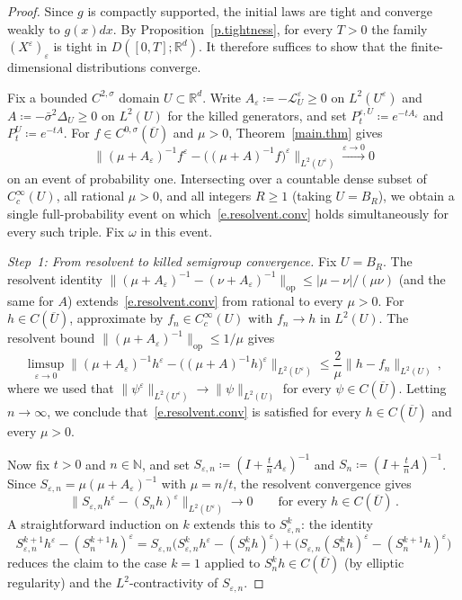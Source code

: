 \documentclass[11pt]{amsart}
\theoremstyle{plain}
\theoremstyle{definition}
\theoremstyle{remark}
\newcommand{\Rd}{\mathbb{R}^d}
\newcommand{\eps}{\varepsilon}
\begin{document}
	\begin{proof}
		Since $g$ is compactly supported, the initial laws are tight and converge weakly to $g(x) dx$.
		By Proposition~\ref{p.tightness}, for every $T > 0$ the family $(X^\eps)_\eps$ is tight in $D([0,T]; \Rd)$.
		It therefore suffices to show that the finite-dimensional distributions converge.
		
		Fix a bounded $C^{2,\sigma}$ domain $U \subset \Rd$.
		Write $A_\eps \coloneqq -\mathcal{L}_U^\eps \ge 0$ on $L^2(U^\eps)$ and $A \coloneqq -\bar\sigma^2 \Delta_U \ge 0$ on $L^2(U)$ for the killed generators, and set $P_t^{\eps,U} \coloneqq e^{-tA_\eps}$ and $P_t^U \coloneqq e^{-tA}$.
		For $f \in C^{0,\sigma}(\overline{U})$ and $\mu > 0$, Theorem~\ref{main.thm} gives
		\begin{equation}
			\label{e.resolvent.conv}
			\bigl\|(\mu + A_\eps)^{-1}f^\eps - \bigl((\mu + A)^{-1}f\bigr)^\eps\bigr\|_{L^2(U^\eps)} \xrightarrow{\eps \to 0} 0
		\end{equation}
		on an event of probability one.
		Intersecting over a countable dense subset of $C_c^\infty(U)$, all rational $\mu > 0$, and all integers $R \ge 1$ (taking $U = B_R$), we obtain a single full-probability event on which~\eqref{e.resolvent.conv} holds simultaneously for every such triple.
		Fix $\omega$ in this event.
		
		\smallskip
		
		\emph{Step~1: From resolvent to killed semigroup convergence.}
		Fix $U = B_R$.
		The resolvent identity $\|(\mu + A_\eps)^{-1} - (\nu + A_\eps)^{-1}\|_{\mathrm{op}} \le |\mu - \nu|/(\mu\nu)$ (and the same for $A$) extends~\eqref{e.resolvent.conv} from rational to every $\mu > 0$.
		For $h \in C(\overline{U})$, approximate by $f_n \in C_c^\infty(U)$ with $f_n \to h$ in $L^2(U)$.
		The resolvent bound $\|(\mu + A_\eps)^{-1}\|_{\mathrm{op}} \le 1/\mu$ gives
		\[
		\limsup_{\eps \to 0} \bigl\|(\mu + A_\eps)^{-1}h^\eps - \bigl((\mu + A)^{-1}h\bigr)^\eps\bigr\|_{L^2(U^\eps)} \le \frac{2}{\mu}\|h - f_n\|_{L^2(U)}\,,
		\]
		where we used that $\|\psi^\eps\|_{L^2(U^\eps)} \to \|\psi\|_{L^2(U)}$ for every $\psi \in C(\overline{U})$.
		Letting $n \to \infty$, we conclude that~\eqref{e.resolvent.conv} is satisfied for every $h \in C(\overline{U})$ and every $\mu > 0$.
		
		Now fix $t > 0$ and $n \in \mathbb{N}$, and set $S_{\eps,n} \coloneqq (I + \tfrac{t}{n}A_\eps)^{-1}$ and $S_n \coloneqq (I + \tfrac{t}{n}A)^{-1}$.
		Since $S_{\eps,n} = \mu(\mu + A_\eps)^{-1}$ with $\mu = n/t$, the resolvent convergence gives
		\[
		\|S_{\eps,n} h^\eps - (S_n h)^\eps\|_{L^2(U^\eps)} \to 0
		\qquad \text{for every } h \in C(\overline{U})\,.
		\]
		A straightforward induction on $k$ extends this to $S_{\eps,n}^k$: the identity
		\[
		S_{\eps,n}^{k+1}h^\eps - (S_n^{k+1}h)^\eps
		= S_{\eps,n}\bigl(S_{\eps,n}^k h^\eps - (S_n^k h)^\eps\bigr)
		+ \bigl(S_{\eps,n}(S_n^k h)^\eps - (S_n^{k+1}h)^\eps\bigr)
		\]
		reduces the claim to the case $k = 1$ applied to $S_n^k h \in C(\overline{U})$ (by elliptic regularity) and the $L^2$-contractivity of $S_{\eps,n}$.
		

\end{proof}
\end{document}
